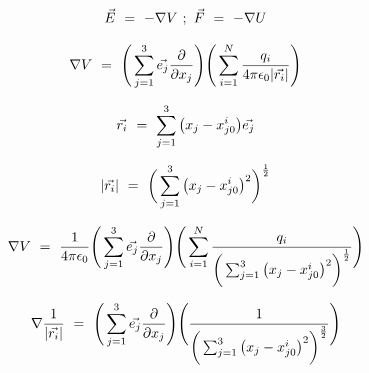 \documentclass{article}
\begin{document}
\begin{equation} \label{eq:15}
\vec{E} \hspace{0.125cm} = \hspace{0.125cm} -\nabla{V} \hspace{0.125cm} ; \hspace{0.125cm} \vec{F} \hspace{0.125cm} = \hspace{0.125cm} -\nabla{U} 
\end{equation}

\begin{equation} \label{eq:16}
\nabla{V} \hspace{0.125cm} = \hspace{0.125cm} \Bigg( \sum_{j=1}^{3} \vec{e_j} \frac{\partial{}}{\partial{x_j}} \Bigg) \Bigg(\sum_{i=1}^{N} \frac{q_i}{4\pi \epsilon_0 |\vec{r_i}|} \Bigg) 
\end{equation}

\begin{equation} \label{eq:17}
\vec{r_i} \hspace{0.125cm} = \hspace{0.125cm} \sum_{j=1}^{3} \big( x_{j} - x_{j0}^{i} \big)\vec{e_{j}} 
\end{equation}

\begin{equation} \label{eq:18}
|\vec{r_i}| \hspace{0.125cm} = \hspace{0.125cm} \bigg( \sum_{j=1}^{3} \big( x_{j} - x_{j0}^{i} \big)^{2} \bigg)^{\frac{1}{2}}
\end{equation}

\begin{equation} \label{eq:19}
\nabla{V} \hspace{0.125cm} = \hspace{0.125cm} \frac{1}{4\pi \epsilon_0}\Bigg( \sum_{j=1}^{3} \vec{e_j} \frac{\partial{}}{\partial{x_j}} \Bigg) \Bigg( \sum_{i=1}^{N} \frac{q_i}{\bigg( \sum_{j=1}^{3} \big( x_{j} - x_{j0}^{i} \big)^{2} \bigg)^{\frac{1}{2}}} \Bigg)
\end{equation}

\begin{equation} \label{eq:20}
\nabla{\frac{1}{|\vec{r_i}|}} \hspace{0.125cm} = \hspace{0.125cm} \Bigg( \sum_{j=1}^{3} \vec{e_j} \frac{\partial{}}{\partial{x_j}} \Bigg) \Bigg( \frac{1}{\bigg( \sum_{j=1}^{3} \big( x_{j} - x_{j0}^{i} \big)^{2} \bigg)^{\frac{3}{2}}} \Bigg) 
\end{equation}
\end{document}
